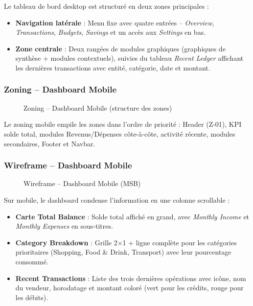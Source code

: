 Le tableau de bord desktop est structuré en deux zones principales :
\begin{itemize}
    \item \textbf{Navigation latérale} : Menu fixe avec quatre entrées -- \textit{Overview}, \textit{Transactions}, \textit{Budgets}, \textit{Savings}  et un accès aux \textit{Settings} en bas.
    \item \textbf{Zone centrale} : Deux rangées de modules graphiques (graphiques de synthèse + modules contextuels), suivies du tableau \textit{Recent Ledger} affichant les dernières transactions avec entité, catégorie, date et montant.
\end{itemize}

\subsubsection{Zoning -- Dashboard Mobile}

\begin{figure}[H]
    \centering
    \caption{Zoning -- Dashboard Mobile (structure des zones)}
    \label{fig:zoning-dashboard-mobile}
\end{figure}

Le zoning mobile empile les zones dans l'ordre de priorité : Header (Z-01), KPI solde total, modules Revenus/Dépenses côte-à-côte, activité récente, modules secondaires, Footer et Navbar.

\subsubsection{Wireframe -- Dashboard Mobile}

\begin{figure}[H]
    \centering
    \caption{Wireframe -- Dashboard Mobile (MSB)}
    \label{fig:wireframe-dashboard-mobile}
\end{figure}

Sur mobile, le dashboard condense l'information en une colonne scrollable :
\begin{itemize}
    \item \textbf{Carte Total Balance} : Solde total affiché en grand, avec \textit{Monthly Income} et \textit{Monthly Expenses} en sous-titres.
    \item \textbf{Category Breakdown} : Grille 2×1 + ligne complète pour les catégories prioritaires (Shopping, Food \& Drink, Transport) avec leur pourcentage consommé.
    \item \textbf{Recent Transactions} : Liste des trois dernières opérations avec icône, nom du vendeur, horodatage et montant coloré (vert pour les crédits, rouge pour les débits).
\end{itemize}

